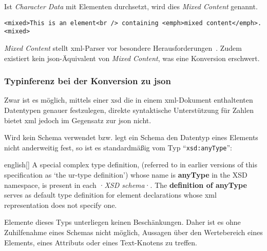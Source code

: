 \begin{example}
     Ist \emph{Character Data} mit Elementen durchsetzt, wird dies \emph{Mixed Content} genannt.
    \begin{verbatim}
<mixed>This is an element<br /> containing <emph>mixed content</emph>.<mixed>
    \end{verbatim}
\end{example}

\emph{Mixed Content} stellt \acrshort{xml}-Parser vor besondere Herausforderungen~\cite{mcgrath2002mixedcontent}. Zudem existiert kein \acrshort{json}-Äquivalent von \emph{Mixed Content}, was eine Konversion erschwert.

\subsubsection{Typinferenz bei der Konversion zu \acrshort{json}}

Zwar ist es möglich, mittels einer \acrfull{xsd} die in einem \acrshort{xml}-Dokument enthaltenten Datentypen genauer festzulegen, direkte syntaktische Unterstützung für Zahlen bietet \acrshort{xml} jedoch im Gegensatz zur \acrlong{json} nicht.

\begin{samepage}
Wird kein Schema verwendet bzw. legt ein Schema den Datentyp eines Elements nicht anderweitig fest, so ist es standardmäßig vom Typ \enquote{\texttt{xsd:anyType}}:
\begin{foreigndisplayquote}{english}[{\cite[Abschn.~2.2.1.1]{xmlschema11-1}}]
    A special complex type definition, (referred to in earlier versions of this specification as `the ur-type definition') whose name is \textbf{anyType} in the XSD namespace, is present in each ·\emph{XSD schema}·. The \textbf{definition of anyType} serves as default type definition for element declarations whose \acrshort{xml} represen\-tation does not specify one.
\end{foreigndisplayquote}
\end{samepage}

Elemente dieses Typs unterliegen keinen Beschänkungen. Daher ist es ohne Zuhilfenahme eines Schemas nicht möglich, Aussagen über den Wertebereich eines Elements, eines Attributs oder eines Text-Knotens zu treffen.

